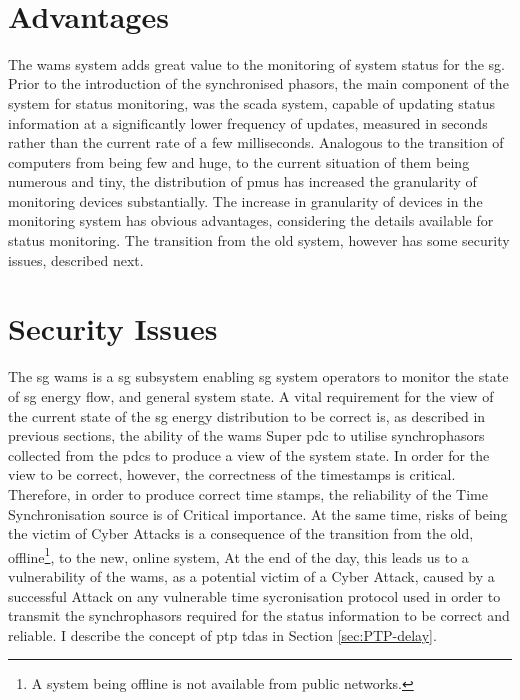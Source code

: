 \
 






\section{Advantages}
The \acrshort{wams} system adds great value to the monitoring of system status for the \acrlong{sg}. Prior to the introduction of the synchronised phasors, the main component of the system for status monitoring, was the \acrshort{scada} system, capable of updating status information at a significantly lower frequency of updates, measured in seconds rather than the current rate of a few milliseconds. Analogous to the transition of computers from being few and huge, to the current situation of them being numerous and tiny, the distribution of \acrshort{pmu}s has increased the granularity of monitoring devices substantially.
The increase in granularity of devices in the monitoring system has obvious advantages, considering the details available for status monitoring. The transition from the old system, however has some security issues, described next.

\section{Security Issues}
The \acrfull{sg} \acrfull{wams} is a \acrshort{sg} subsystem enabling \acrshort{sg} system operators to monitor the state of \acrshort{sg} energy flow, and general system state. 
A vital requirement for the view of the current state of the \acrshort{sg} energy distribution to be correct is, as described in previous sections, the ability of the \acrshort{wams} Super \acrshort{pdc} to utilise synchrophasors collected from the \acrshort{pdc}s to produce a view of the system state. In order for the view to be correct, however, the correctness of the timestamps is critical. Therefore, in order to produce correct time stamps, the reliability of the Time Synchronisation source is of Critical importance. At the same time, risks of being the victim of Cyber Attacks is a consequence of the transition from the old, offline\footnote{A system being offline is not available from public networks.}, to the new, online system, At the end of the day, this leads us to a vulnerability of the \acrshort{wams}, as a potential victim of a Cyber Attack, caused by a successful Attack on any vulnerable time sycronisation protocol used in order to transmit the synchrophasors required for the status information to be correct and reliable. I describe the concept of \acrlong{ptp} \acrlong{tda}s in Section \ref{sec:PTP-delay}.


